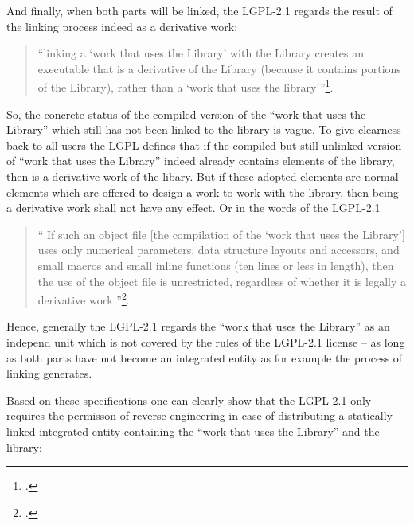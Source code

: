 And finally, when both parts will be linked, the LGPL-2.1 regards the
result of the linking process indeed as a derivative work:
\begin{quote}\enquote{linking a \enquote{work that uses the Library} with the
Library creates an executable that is a derivative of the Library (because it
contains portions of the Library), rather than a \enquote{work that uses the
library}}\footcite[cf.][\nopage wp §5]{Lgpl21OsiLicense1999a}.
\end{quote}

So, the concrete status of the compiled version of the \enquote{work that uses
the Library} which still has not been linked to the library is vague. To give
clearness back to all users the LGPL defines that if the compiled but still
unlinked version of \enquote{work that uses the Library} indeed already contains
elements of the library, then is a derivative work of the libary. But if these
adopted elements are normal elements which are offered to design a work to work
with the library, then being a derivative work shall not have any effect. Or in
the words of the LGPL-2.1

\begin{quote}\enquote{ If such an object file [the compilation of the
\enquote{work that uses the Library}] uses only numerical parameters, data structure
layouts and accessors, and small macros and small inline functions (ten lines or
less in length), then the use of the object file is unrestricted, regardless of
whether it is legally a derivative work }\footcite[cf.][\nopage wp
§5]{Lgpl21OsiLicense1999a}.
\end{quote}

Hence, generally the LGPL-2.1 regards the \enquote{work that uses the Library}
as an independ unit which is not covered by the rules of the LGPL-2.1 license --
as long as both parts have not become an integrated entity as for example the
process of linking generates.

Based on these specifications one can clearly show that the LGPL-2.1 only
requires the permisson of reverse engineering in case of distributing a
statically linked integrated entity containing the \enquote{work that uses the
Library} and the library:

